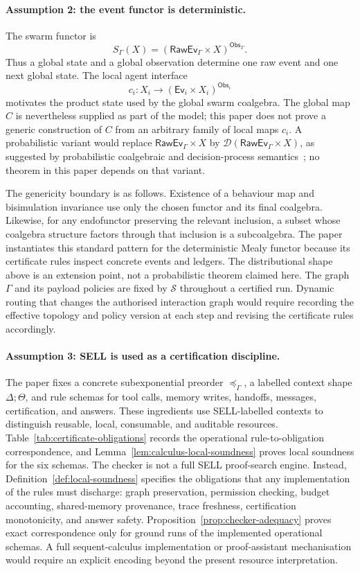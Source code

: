 \documentclass[a4paper,fleqn]{cas-sc}
\newcommand{\D}{\mathcal{D}}
\newcommand{\Obs}{\mathsf{Obs}}
\newcommand{\Ev}{\mathsf{Ev}}
\newcommand{\RawEv}{\mathsf{RawEv}}
\begin{document}
\paragraph{Assumption 2: the event functor is deterministic.}
The swarm functor is
\[
  S_{\Gamma}(X)=(\RawEv_{\Gamma}\times X)^{\Obs_{\Gamma}}.
\]
Thus a global state and a global observation determine one raw event and one next global state. The local agent interface
\[
  c_i:X_i\to(\Ev_i\times X_i)^{\Obs_i}
\]
motivates the product state used by the global swarm coalgebra. The global map
\(C\) is nevertheless supplied as part of the model; this paper does not prove
a generic construction of \(C\) from an arbitrary family of local maps
\(c_i\). A probabilistic variant would replace \(\RawEv_{\Gamma}\times X\) by
\(\D(\RawEv_{\Gamma}\times X)\), as suggested by probabilistic coalgebraic
and decision-process semantics~\cite{sokolova2011,feys2018}; no theorem in
this paper depends on that variant.

The genericity boundary is as follows. Existence of a behaviour map and
bisimulation invariance use only the chosen functor and its final coalgebra.
Likewise, for any endofunctor preserving the relevant inclusion, a subset whose
coalgebra structure factors through that inclusion is a subcoalgebra. The paper
instantiates this standard pattern for the deterministic Mealy functor because
its certificate rules inspect concrete events and ledgers. The distributional
shape above is an extension point, not a probabilistic theorem claimed here.
The graph \(\Gamma\) and its payload policies are fixed by \(\mathcal S\)
throughout a certified run. Dynamic routing that changes the authorised
interaction graph would require recording the effective topology and policy
version at each step and revising the certificate rules accordingly.

\paragraph{Assumption 3: SELL is used as a certification discipline.}
The paper fixes a concrete subexponential preorder \(\preceq_{\Gamma}\), a labelled context shape \(\Delta;\Theta\), and rule schemas for tool calls, memory writes, handoffs, messages, certification, and answers. These ingredients use SELL-labelled contexts to distinguish reusable, local, consumable, and auditable resources. Table~\ref{tab:certificate-obligations} records the operational rule-to-obligation correspondence, and Lemma~\ref{lem:calculus-local-soundness} proves local soundness for the six schemas. The checker is not a full SELL proof-search engine. Instead, Definition~\ref{def:local-soundness} specifies the obligations that any implementation of the rules must discharge: graph preservation, permission checking, budget accounting, shared-memory provenance, trace freshness, certification monotonicity, and answer safety. Proposition~\ref{prop:checker-adequacy} proves exact correspondence only for ground runs of the implemented operational schemas. A full sequent-calculus implementation or proof-assistant mechanisation would require an explicit encoding beyond the present resource interpretation.
\end{document}
